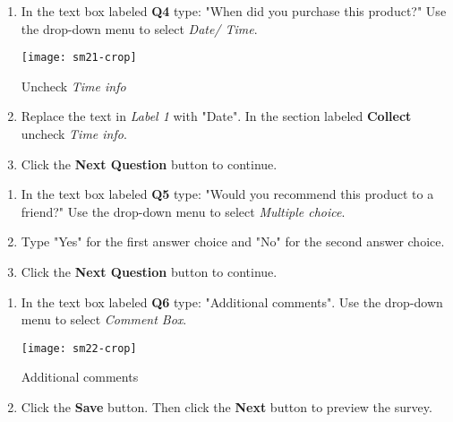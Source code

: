 \documentclass{tufte-handout}
\begin{document}
\begin{enumerate}
    \item In the text box labeled \textbf{Q4} type: "When did you purchase this product?" Use the drop-down menu to select \textit{Date/ Time}.
    
        \begin{marginfigure}%
            \texttt{[image: sm21-crop]}
            \caption{Uncheck \textit{Time info}}
            \label{fig:marginfig5}
        \end{marginfigure} 
    
    \item Replace the text in \textit{Label 1} with "Date". In the section labeled \textbf{Collect} uncheck \textit{Time info}.
    \item Click the \textbf{Next Question} button to continue.
\end{enumerate}

\begin{enumerate}
    \item In the text box labeled \textbf{Q5} type: "Would you recommend this product to a friend?" Use the drop-down menu to select \textit{Multiple choice}. 
    \item Type "Yes" for the first answer choice and "No" for the second answer choice.
    \item Click the \textbf{Next Question} button to continue.
\end{enumerate}

\begin{enumerate}
    \item In the text box labeled \textbf{Q6} type: "Additional comments". Use the drop-down menu to select \textit{Comment Box}. 
    
        \begin{marginfigure}%
            \texttt{[image: sm22-crop]}
            \caption{Additional comments}
            \label{fig:marginfig6}
        \end{marginfigure}
    
    
    \item Click the \textbf{Save} button. Then click the \textbf{Next} button to preview the survey.
\end{enumerate}
\end{document}
